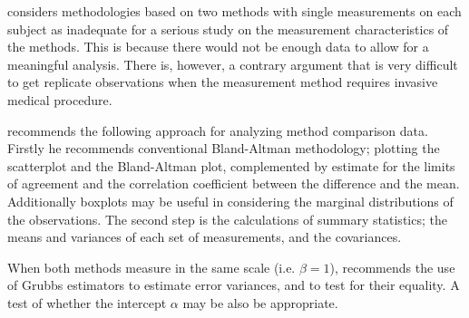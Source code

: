 \documentclass[12pt, a4paper]{report}
\begin{document}
	
	\citet{DunnSEME} considers methodologies based on two methods with single measurements on each subject as inadequate for a serious study
	on the measurement characteristics of the methods. This is because there would not be enough data to allow for a meaningful analysis.
	There is, however, a contrary argument that is very difficult to get replicate
	observations when the measurement method requires invasive medical procedure.
	
	\citet{DunnSEME} recommends the following approach for analyzing
	method comparison data. Firstly he recommends conventional
	Bland-Altman methodology; plotting the scatterplot and the
	Bland-Altman plot, complemented by estimate for the limits of
	agreement and the correlation coefficient between the difference
	and the mean. Additionally boxplots may be useful in considering
	the marginal distributions of the observations. The second step is
	the calculations of summary statistics; the means and variances of
	each set of measurements, and the covariances.
	
	When both methods measure in the same scale (i.e. $\beta = 1$),
	\citet{DunnSEME} recommends the use of Grubbs estimators to
	estimate error variances, and to test for their equality. A test
	of whether the intercept $\alpha$ may be also be appropriate.
	
	
	
	
	

	
	
	
	
	
	
	
\end{document}
